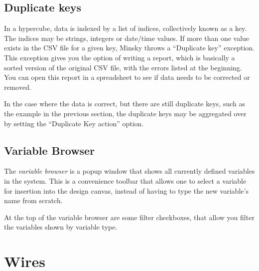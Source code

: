 \begin{center}
\end{center}

\subsection{Duplicate keys}

In a hypercube, data is indexed by a list of indices, collectively
known as a key. The indices may be strings, integers or date/time
values. If more than one value exists in the CSV file for a given key,
Minsky throws a ``Duplicate key'' exception. This exception gives you
the option of writing a report, which is basically a sorted version of
the original CSV file, with the errors listed at the beginning. You
can open this report in a spreadsheet to see if data needs to be
corrected or removed.

In the case where the data is correct, but there are still duplicate
keys, such as the example in the previous section, the duplicate keys
may be aggregated over by setting the ``Duplicate Key action'' option.

\subsection{Variable Browser}\label{VariableBrowser}

The {\em variable browser} is a popup window that shows all currently
defined variables in the system. This is a convenience toolbar that
allows one to select a variable for insertion into the design canvas,
instead of having to type the new variable's name from scratch.

At the top of the variable browser are some filter checkboxes, that
allow you filter the variables shown by variable type.

\section{Wires}

